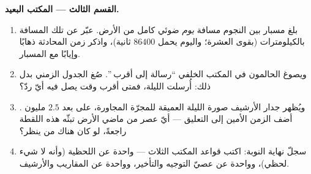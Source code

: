 \begin{problem}
\medskip\noindent\textbf{القسم الثالث --- المكتب البعيد.}
\begin{enumerate}[resume]
  \item بلغ مسبار بين النجوم مسافة \emph{يوم} ضوئي كامل من
        الأرض. عبّر عن تلك المسافة بالكيلومترات (بقوى العشرة؛
        واليوم يحمل $86400$ ثانية)، واذكر زمن المحادثة ذهابًا
        وإيابًا مع المسبار.
  \item ويصوغ الحالمون في المكتب الخلفي ``رسالة إلى أقرب
        ''. صُغ الجدول الزمني بدل ذلك: أُرسلت الليلة، فمتى
        أقرب وقت يصل فيه أيّ ردّ؟
  \item ويُظهر جدار الأرشيف صورة الليلة العميقة للمجرّة
        المجاورة، على بعد $2.5$ مليون . أضف الزمن
        الأمين إلى التعليق --- أيّ عصر من ماضي الأرض تبثّه
        هذه اللقطة راجعةً، لو كان هناك من ينظر؟
  \item سجلّ نهاية النوبة: اكتب قواعد المكتب الثلاث ---
        واحدة عن اللحظية (وأنه لا شيء لحظي)، وواحدة عن عصيّ
        التوجيه والتأخير، وواحدة عن المقاريب والأرشيف.
\end{enumerate}
\end{problem}
